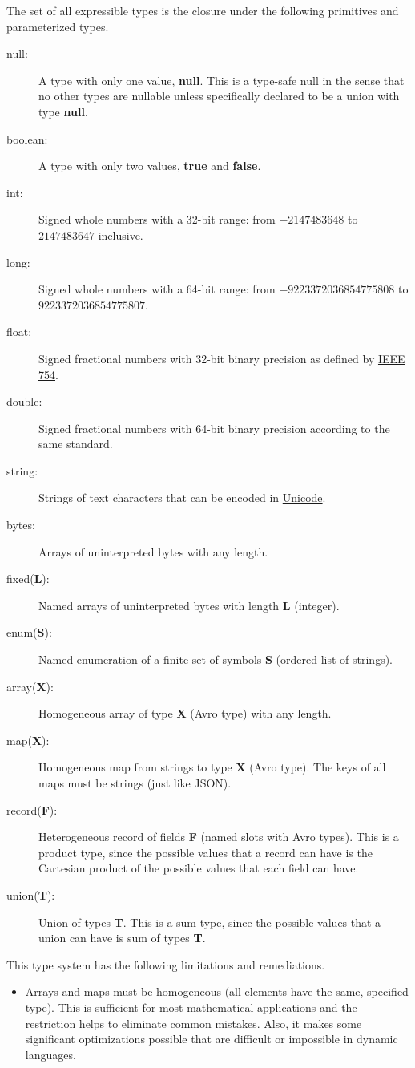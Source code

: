 \documentclass{article}
\newcommand{\PFAc}{\ttfamily\bfseries}
\newcommand{\PFAtp}{\ttfamily\bfseries}
\newenvironment{allowedfields}%
  {\begin{center} \begin{minipage}{0.9\linewidth} \begin{description}}%
  {\end{description} \end{minipage} \end{center}}
\theoremstyle{definition}
\begin{document}
The set of all expressible types is the closure under the following primitives and parameterized types.
\begin{allowedfields}
\item[null:] A type with only one value, {\PFAc null}.  This is a type-safe null in the sense that no other types are nullable unless specifically declared to be a union with type {\bf null}.
\item[boolean:] A type with only two values, {\PFAc true} and {\PFAc false}.
\item[int:] Signed whole numbers with a 32-bit range: from $-2147483648$ to $2147483647$ inclusive.
\item[long:] Signed whole numbers with a 64-bit range: from $-9223372036854775808$ to $9223372036854775807$.
\item[float:] Signed fractional numbers with 32-bit binary precision as defined by \href{http://dx.doi.org/10.1109%2FIEEESTD.2008.4610935}{IEEE 754}.
\item[double:] Signed fractional numbers with 64-bit binary precision according to the same standard.
\item[string:] Strings of text characters that can be encoded in \href{http://www.unicode.org/standard/standard.html}{Unicode}.
\item[bytes:] Arrays of uninterpreted bytes with any length.
\item[fixed({\PFAtp L}):] Named arrays of uninterpreted bytes with length {\PFAtp L} (integer).
\item[enum({\PFAtp S}):] Named enumeration of a finite set of symbols {\PFAtp S} (ordered list of strings).
\item[array({\PFAtp X}):] Homogeneous array of type {\PFAtp X} (Avro type) with any length.
\item[map({\PFAtp X}):] Homogeneous map from strings to type {\PFAtp X} (Avro type).  The keys of all maps must be strings (just like JSON).
\item[record({\PFAtp F}):] Heterogeneous record of fields {\PFAtp F} (named slots with Avro types).  This is a product type, since the possible values that a record can have is the Cartesian product of the possible values that each field can have.
\item[union({\PFAtp T}):] Union of types {\PFAtp T}.  This is a sum type, since the possible values that a union can have is sum of types {\PFAtp T}.
\end{allowedfields}

\noindent\begin{minipage}{\linewidth}
\indent This type system has the following limitations and remediations.
\begin{itemize}
\item Arrays and maps must be homogeneous (all elements have the same, specified type).  This is sufficient for most mathematical applications and the restriction helps to eliminate common mistakes.  Also, it makes some significant optimizations possible that are difficult or impossible in dynamic languages.
\end{itemize}
\end{minipage}
\end{document}
